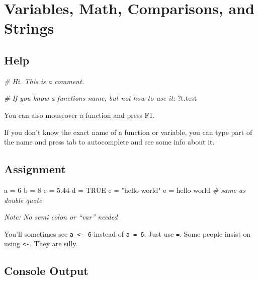\documentclass[
]{book}
\newenvironment{Shaded}{\begin{snugshade}}{\end{snugshade}}
\newcommand{\CommentTok}[1]{\textcolor[rgb]{0.56,0.35,0.01}{\textit{#1}}}
\newcommand{\ConstantTok}[1]{\textcolor[rgb]{0.00,0.00,0.00}{#1}}
\newcommand{\DecValTok}[1]{\textcolor[rgb]{0.00,0.00,0.81}{#1}}
\newcommand{\FloatTok}[1]{\textcolor[rgb]{0.00,0.00,0.81}{#1}}
\newcommand{\NormalTok}[1]{#1}
\newcommand{\OtherTok}[1]{\textcolor[rgb]{0.56,0.35,0.01}{#1}}
\newcommand{\StringTok}[1]{\textcolor[rgb]{0.31,0.60,0.02}{#1}}
\begin{document}
\hypertarget{variables-math-comparisons-and-strings}{%
\chapter{Variables, Math, Comparisons, and Strings}\label{variables-math-comparisons-and-strings}}

\hypertarget{help}{%
\section{Help}\label{help}}

\begin{Shaded}
\begin{Highlighting}[]
\CommentTok{\# Hi. This is a comment.}

\CommentTok{\# If you know a function\textquotesingle{}s name, but not how to use it:}
\NormalTok{?t.test}
\end{Highlighting}
\end{Shaded}

You can also mouseover a function and press F1.

If you don't know the exact name of a function or variable, you can type part of the name and press tab to autocomplete and see some info about it.

\hypertarget{assignment}{%
\section{Assignment}\label{assignment}}

\begin{Shaded}
\begin{Highlighting}[]
\NormalTok{a }\OtherTok{=} \DecValTok{6}
\NormalTok{b }\OtherTok{=} \DecValTok{8}
\NormalTok{c }\OtherTok{=} \FloatTok{5.44}
\NormalTok{d }\OtherTok{=} \ConstantTok{TRUE}
\NormalTok{e }\OtherTok{=} \StringTok{"hello world"} 
\NormalTok{e }\OtherTok{=} \StringTok{\textquotesingle{}hello world\textquotesingle{}} \CommentTok{\# same as double quote}
\end{Highlighting}
\end{Shaded}

\emph{Note: No semi colon or ``var'' needed}

You'll sometimes see \texttt{a\ \textless{}-\ 6} instead of \texttt{a\ =\ 6}. Just use \texttt{=}. Some people insist on using \texttt{\textless{}-}. They are silly.

\hypertarget{console-output}{%
\section{Console Output}\label{console-output}}
\end{document}
